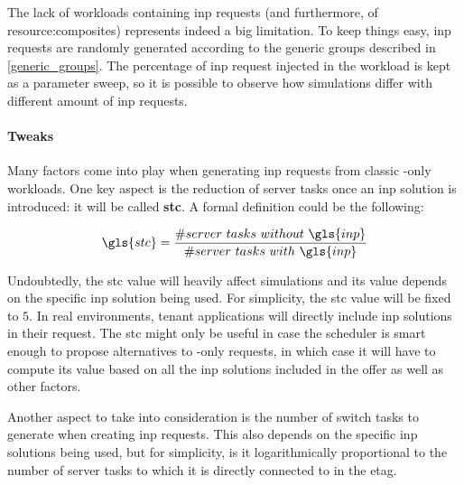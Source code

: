 The lack of workloads containing \gls{inp} requests (and furthermore, of \glspl{resource:composite}) represents indeed a big limitation.
To keep things easy, \gls{inp} requests are randomly generated according to the generic groups described in \autoref{generic_groups}.
The percentage of \gls{inp} request injected in the workload is kept as a parameter sweep, so it is possible to observe how simulations differ with different amount of \gls{inp} requests.

\paragraph{Tweaks}
Many factors come into play when generating \gls{inp} requests from classic -only workloads.
One key aspect is the reduction of server tasks once an \gls{inp} solution is introduced: it will be called \textbf{\gls{stc}}.
A formal definition could be the following:

\begin{equation}
\label{stc_formula}
\gls{stc}=\dfrac{\#server\ tasks\ without\ \gls{inp}}{\#server\ tasks\ with\ \gls{inp}}
\end{equation}

Undoubtedly, the \gls{stc} value will heavily affect simulations and its value depends on the specific \gls{inp} solution being used.
For simplicity, the \gls{stc} value will be fixed to $5$. %
In real environments, tenant applications will directly include \gls{inp} solutions in their request.
The \gls{stc} might only be useful in case the scheduler is smart enough to propose alternatives to -only requests, in which case it will have to compute its value based on all the \gls{inp} solutions included in the offer as well as other factors.

Another aspect to take into consideration is the number of switch tasks to generate when creating \gls{inp} requests.
This also depends on the specific \gls{inp} solutions being used, but for simplicity, is it logarithmically proportional to the number of server tasks to which it is directly connected to in the \gls{etag}. %

